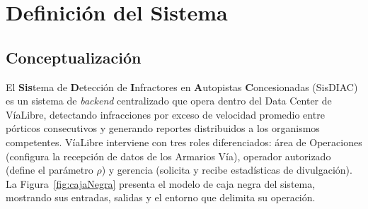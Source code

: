 \documentclass[12pt,letterpaper]{article}
\begin{document}
\newpage
\section{Definición del Sistema}
\subsection{Conceptualización}
El \textbf{Sis}tema de \textbf{D}etección de \textbf{I}nfractores en \textbf{A}utopistas \textbf{C}oncesionadas (SisDIAC) es un sistema de \textit{backend} centralizado que opera dentro del Data Center de VíaLibre, detectando infracciones por exceso de velocidad promedio entre pórticos consecutivos y generando reportes distribuidos a los organismos competentes. VíaLibre interviene con tres roles diferenciados: área de Operaciones (configura la recepción de datos de los Armarios Vía), operador autorizado (define el parámetro $\rho$) y gerencia (solicita y recibe estadísticas de divulgación).
La Figura~\ref{fig:cajaNegra} presenta el modelo de caja negra del sistema, mostrando sus entradas, salidas y el entorno que delimita su operación.
\end{document}
